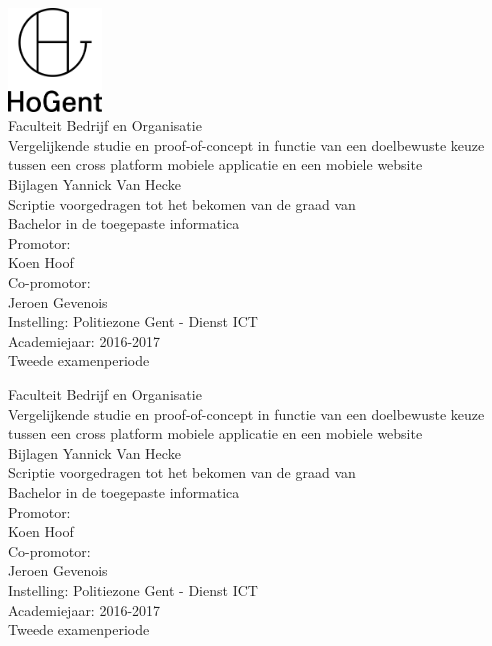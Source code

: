 \documentclass[pdftex,a4paper,12pt,twoside]{report}
\newcommand{\emptypage}{
\newpage
\thispagestyle{empty}
\mbox{}
\newpage
}
\newcommand{\student}{Yannick Van Hecke}
\newcommand{\promotor}{Koen Hoof}
\newcommand{\copromotor}{Jeroen Gevenois}
\newcommand{\instelling}{Politiezone Gent - Dienst ICT}
\newcommand{\titel}{Vergelijkende studie en proof-of-concept in functie van een doelbewuste keuze tussen een cross platform mobiele applicatie en een mobiele website}
\newcommand{\faculteit}{Faculteit Bedrijf en Organisatie}
\newcommand{\rapporttype}{Scriptie voorgedragen tot het bekomen van de graad van\\Bachelor in de toegepaste informatica}
\newcommand{\academiejaar}{2016-2017}
\newcommand{\examenperiode}{Tweede examenperiode}
\begin{document}

\begin{titlepage}
  \begin{center}

    \begingroup
    \rmfamily
    \includegraphics[width=2.5cm]{img/HG-beeldmerk-woordmerk}\\[.5cm]
    \faculteit\\[3cm]
    \titel\\[1cm]
    Bijlagen
    \vfill
    \student\\[3.5cm]
    \rapporttype\\[2cm]
    Promotor:\\
    \promotor\\
    Co-promotor:\\
    \copromotor\\[2.5cm]
    Instelling: \instelling\\[.5cm]
    Academiejaar: \academiejaar\\[.5cm]
    \examenperiode
    \endgroup

  \end{center}
  \restoregeometry
\end{titlepage}


\emptypage


\begin{titlepage}
  \begin{center}

    \begingroup
    \rmfamily
    \faculteit\\[3cm]
    \titel\\[1cm]
    Bijlagen
    \vfill
    \student\\[3.5cm]
    \rapporttype\\[2cm]
    Promotor:\\
    \promotor\\
    Co-promotor:\\
    \copromotor\\[2.5cm]
    Instelling: \instelling\\[.5cm]
    Academiejaar: \academiejaar\\[.5cm]
    \examenperiode
    \endgroup

  \end{center}
  \restoregeometry
\end{titlepage}
\end{document}
